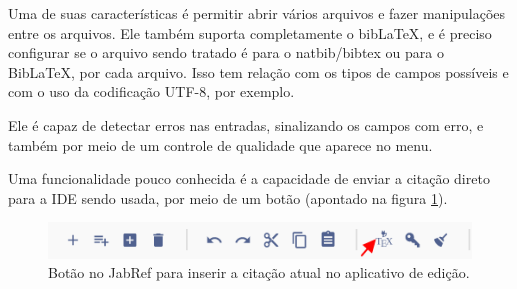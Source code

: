 Uma de suas características é permitir abrir vários arquivos e fazer manipulações entre os arquivos. Ele também suporta completamente o bibLaTeX, e é preciso configurar se o arquivo sendo tratado é para o natbib/bibtex ou para o BibLaTeX, por cada arquivo. Isso tem relação com os tipos de campos possíveis e com o uso da codificação UTF-8, por exemplo.

Ele é capaz de detectar erros nas entradas, sinalizando os campos com erro, e também por meio de um controle de qualidade que aparece no menu. 

Uma funcionalidade pouco conhecida é a capacidade de enviar a citação direto para a IDE sendo usada, por meio de um botão (apontado na figura \ref{fig:jabref-push}).
   

\begin{figure}
    \centering
    \includegraphics[width=0.7\linewidth]{"Images/jabref push"}
    \caption{Botão no JabRef para inserir a citação atual no aplicativo de edição.}
    \label{fig:jabref-push}
\end{figure}






